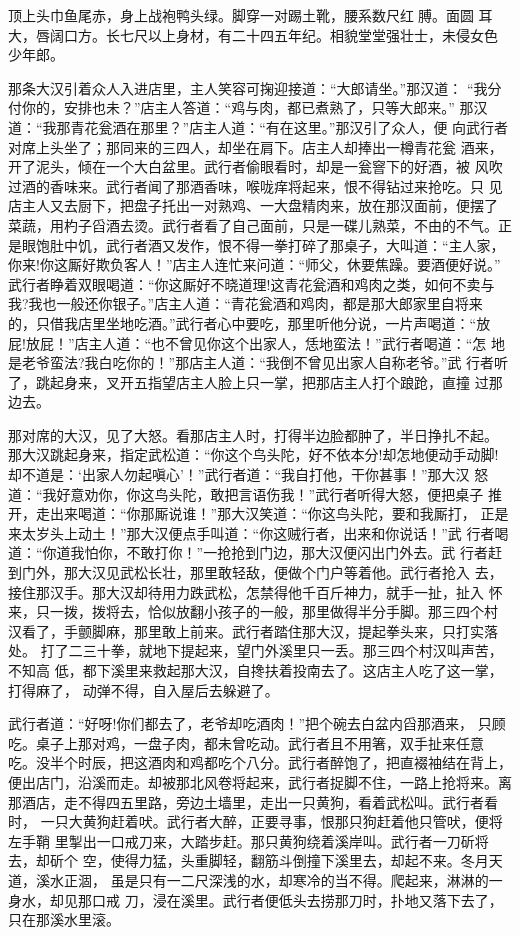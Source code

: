 顶上头巾鱼尾赤，身上战袍鸭头绿。脚穿一对踢土靴，腰系数尺红膊。面圆
耳大，唇阔口方。长七尺以上身材，有二十四五年纪。相貌堂堂强壮士，未侵女色
少年郎。

那条大汉引着众人入进店里，主人笑容可掬迎接道：“大郎请坐。”那汉道：
“我分付你的，安排也未？”店主人答道：“鸡与肉，都已煮熟了，只等大郎来。”
那汉道：“我那青花瓮酒在那里？”店主人道：“有在这里。”那汉引了众人，便
向武行者对席上头坐了；那同来的三四人，却坐在肩下。店主人却捧出一樽青花瓮
酒来，开了泥头，倾在一个大白盆里。武行者偷眼看时，却是一瓮窨下的好酒，被
风吹过酒的香味来。武行者闻了那酒香味，喉咙痒将起来，恨不得钻过来抢吃。只
见店主人又去厨下，把盘子托出一对熟鸡、一大盘精肉来，放在那汉面前，便摆了
菜蔬，用杓子舀酒去烫。武行者看了自己面前，只是一碟儿熟菜，不由的不气。正
是眼饱肚中饥，武行者酒又发作，恨不得一拳打碎了那桌子，大叫道：“主人家，
你来!你这厮好欺负客人！”店主人连忙来问道：“师父，休要焦躁。要酒便好说。”
武行者睁着双眼喝道：“你这厮好不晓道理!这青花瓮酒和鸡肉之类，如何不卖与
我?我也一般还你银子。”店主人道：“青花瓮酒和鸡肉，都是那大郎家里自将来
的，只借我店里坐地吃酒。”武行者心中要吃，那里听他分说，一片声喝道：“放
屁!放屁！”店主人道：“也不曾见你这个出家人，恁地蛮法！”武行者喝道：“怎
地是老爷蛮法?我白吃你的！”那店主人道：“我倒不曾见出家人自称老爷。”武
行者听了，跳起身来，叉开五指望店主人脸上只一掌，把那店主人打个踉跄，直撞
过那边去。

那对席的大汉，见了大怒。看那店主人时，打得半边脸都肿了，半日挣扎不起。
那大汉跳起身来，指定武松道：“你这个鸟头陀，好不依本分!却怎地便动手动脚!
却不道是：‘出家人勿起嗔心’！”武行者道：“我自打他，干你甚事！”那大汉
怒道：“我好意劝你，你这鸟头陀，敢把言语伤我！”武行者听得大怒，便把桌子
推开，走出来喝道：“你那厮说谁！”那大汉笑道：“你这鸟头陀，要和我厮打，
正是来太岁头上动土！”那大汉便点手叫道：“你这贼行者，出来和你说话！”武
行者喝道：“你道我怕你，不敢打你！”一抢抢到门边，那大汉便闪出门外去。武
行者赶到门外，那大汉见武松长壮，那里敢轻敌，便做个门户等着他。武行者抢入
去，接住那汉手。那大汉却待用力跌武松，怎禁得他千百斤神力，就手一扯，扯入
怀来，只一拨，拨将去，恰似放翻小孩子的一般，那里做得半分手脚。那三四个村
汉看了，手颤脚麻，那里敢上前来。武行者踏住那大汉，提起拳头来，只打实落处。
打了二三十拳，就地下提起来，望门外溪里只一丢。那三四个村汉叫声苦，不知高
低，都下溪里来救起那大汉，自搀扶着投南去了。这店主人吃了这一掌，打得麻了，
动弹不得，自入屋后去躲避了。

武行者道：“好呀!你们都去了，老爷却吃酒肉！”把个碗去白盆内舀那酒来，
只顾吃。桌子上那对鸡，一盘子肉，都未曾吃动。武行者且不用箸，双手扯来任意
吃。没半个时辰，把这酒肉和鸡都吃个八分。武行者醉饱了，把直裰袖结在背上，
便出店门，沿溪而走。却被那北风卷将起来，武行者捉脚不住，一路上抢将来。离
那酒店，走不得四五里路，旁边土墙里，走出一只黄狗，看着武松叫。武行者看时，
一只大黄狗赶着吠。武行者大醉，正要寻事，恨那只狗赶着他只管吠，便将左手鞘
里掣出一口戒刀来，大踏步赶。那只黄狗绕着溪岸叫。武行者一刀斫将去，却斫个
空，使得力猛，头重脚轻，翻筋斗倒撞下溪里去，却起不来。冬月天道，溪水正涸，
虽是只有一二尺深浅的水，却寒冷的当不得。爬起来，淋淋的一身水，却见那口戒
刀，浸在溪里。武行者便低头去捞那刀时，扑地又落下去了，只在那溪水里滚。

